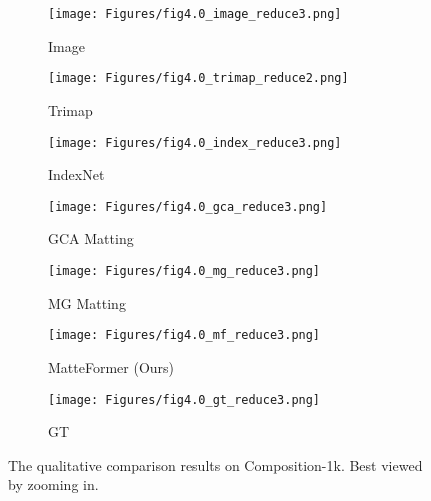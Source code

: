 \documentclass[10pt,twocolumn,letterpaper]{article}
\begin{document}
\begin{figure*}
  \captionsetup[subfigure]{labelformat=empty}
  \centering
  \begin{subfigure}{0.14\textwidth}
    \texttt{[image: Figures/fig4.0\_image\_reduce3.png]}      
    \caption{Image}
    \label{fig:qual_image}
  \end{subfigure}\begin{subfigure}{0.14\textwidth}
    \texttt{[image: Figures/fig4.0\_trimap\_reduce2.png]}      
    \caption{Trimap}
    \label{fig:qual_trimap}
  \end{subfigure}\begin{subfigure}{0.14\textwidth}
    \texttt{[image: Figures/fig4.0\_index\_reduce3.png]}      
    \caption{IndexNet\cite{lu2019indices}}
    \label{fig:qual_index}
  \end{subfigure}\begin{subfigure}{0.14\textwidth}
    \texttt{[image: Figures/fig4.0\_gca\_reduce3.png]}      
    \caption{GCA Matting\cite{li2020natural}}
    \label{fig:qual_gca}
  \end{subfigure}\begin{subfigure}{0.14\textwidth}
    \texttt{[image: Figures/fig4.0\_mg\_reduce3.png]}      
    \caption{MG Matting\cite{yu2021mask}}
    \label{fig:qual_mg}
  \end{subfigure}\begin{subfigure}{0.14\textwidth}
    \texttt{[image: Figures/fig4.0\_mf\_reduce3.png]}      
    \caption{MatteFormer (Ours)}
    \label{fig:qual_mf}
  \end{subfigure}\begin{subfigure}{0.14\textwidth}
    \texttt{[image: Figures/fig4.0\_gt\_reduce3.png]}      
    \caption{GT}
    \label{fig:qual_gt}
  \end{subfigure}\vspace{-2mm}
  \caption{The qualitative comparison results on Composition-1k. Best viewed by zooming in.}
  \label{fig:qualitative_results}
\end{figure*}
\end{document}
